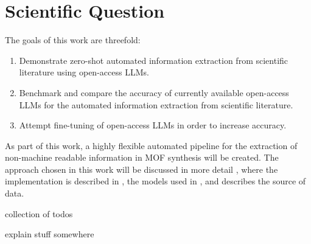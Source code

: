 \section{Scientific Question}\label{sec:question}

The goals of this work are threefold:
\begin{enumerate}
    \item Demonstrate zero-shot automated information extraction from scientific literature using open-access \glspl{LLM}.
    \item Benchmark and compare the accuracy of currently available open-access \glspl{LLM} for the automated information extraction from scientific literature.
    \item Attempt fine-tuning of open-access \glspl{LLM} in order to increase accuracy.
\end{enumerate}

As part of this work, a highly flexible automated pipeline for the extraction of non-machine readable information in \gls{MOF} synthesis will be created.
The approach chosen in this work will be discussed in more detail , where the implementation is described in , the models used in , and  describes the source of data.


\newpage
collection of todos

explain stuff somewhere
